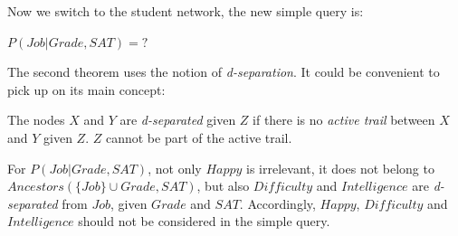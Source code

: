 \begin{example}
    Now we switch to the student network, the new simple query is:
    \begin{center}
        $P(Job|Grade, SAT) = ?$
    \end{center} \vspace{3.5pt}
    The second theorem uses the notion of \textit{d-separation}. It could be convenient to pick up on its main concept: \vspace{3.5pt}
    \begin{center}
        The nodes $X$ and $Y$ are \textit{d-separated} given $Z$ if there is no \textit{active trail} between $X$ and $Y$ given $Z$. $Z$ cannot be part of the active trail.
    \end{center} \vspace{3.5pt}
    For $P(Job|Grade, SAT)$, not only $Happy$ is irrelevant, it does not belong to $Ancestors(\{Job\} \cup Grade, SAT)$, but also $Difficulty$ and $Intelligence$ are \textit{d-separated}
    from $Job$, given $Grade$ and $SAT$. Accordingly, $Happy$, $Difficulty$ and $Intelligence$ should not be considered in the simple query.
\end{example}